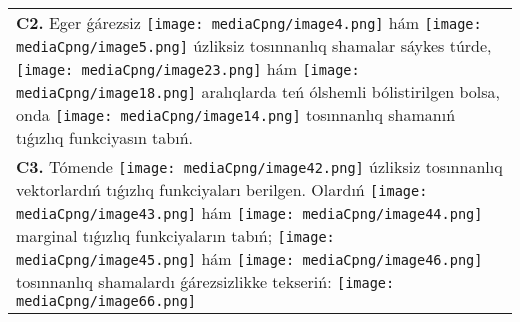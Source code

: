 \documentclass{article}
\begin{document}
\begin{tabular}{m{17cm}}
 \\
\textbf{C2.} Eger ǵárezsiz \texttt{[image: mediaCpng/image4.png]} hám \texttt{[image: mediaCpng/image5.png]} úzliksiz tosınnanlıq shamalar sáykes túrde, \texttt{[image: mediaCpng/image23.png]} hám \texttt{[image: mediaCpng/image18.png]} aralıqlarda teń ólshemli bólistirilgen bolsa, onda \texttt{[image: mediaCpng/image14.png]} tosınnanlıq shamanıń tıǵızlıq funkciyasın tabıń.
 \\
\textbf{C3.} Tómende \texttt{[image: mediaCpng/image42.png]} úzliksiz tosınnanlıq vektorlardıń tıǵızlıq funkciyaları berilgen. Olardıń \texttt{[image: mediaCpng/image43.png]} hám \texttt{[image: mediaCpng/image44.png]} marginal tıǵızlıq funkciyaların tabıń; \texttt{[image: mediaCpng/image45.png]} hám \texttt{[image: mediaCpng/image46.png]} tosınnanlıq shamalardı ǵárezsizlikke tekseriń: \texttt{[image: mediaCpng/image66.png]}
 \\

\end{tabular}
\vspace{1cm}
\end{document}
